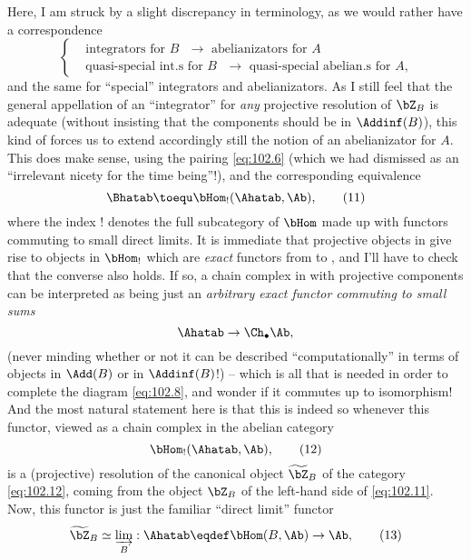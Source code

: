 Here, I am struck by a slight discrepancy in terminology, as we would
rather have a correspondence
\[
\begin{cases}
  &\text{integrators for $B$ $\to$ abelianizators for $A$} \\
  &\text{quasi-special int.s for $B$ $\to$ quasi-special abelian.s for $A$,}
\end{cases}\]
and the same for ``special'' integrators and abelianizators. As I
still feel that the general appellation of an ``integrator'' for
\emph{any} projective resolution of $\bZ_B$ is adequate (without
insisting that the components should be in $\Addinf(B)$), this kind of
forces us to extend accordingly still the notion of an abelianizator
for $A$. This does make sense, using the pairing \eqref{eq:102.6}
(which we had dismissed as an ``irrelevant nicety for the time
being''!), and the corresponding equivalence
\begin{equation}
  \label{eq:102.11}
  \Bhatab \toequ \bHom_!(\Ahatab, \Ab),\tag{11}
\end{equation}
where the index $!$ denotes the full subcategory of $\bHom$ made up
with functors commuting to small direct limits. It is immediate that
projective objects in \Bhatab{} give rise to objects in $\bHom_!$
which are \emph{exact} functors from \Ahatab{} to \Ab, and I'll have to
check that the converse also holds. If so, a chain complex in
\Bhatab{} with projective components can be interpreted as being just
an \emph{arbitrary exact functor commuting to small sums}
\[ \Ahatab \to \Ch_\bullet\Ab,\]
(never minding whether or not it can be described ``computationally''
in terms of objects in $\Add(B)$ or in $\Addinf(B)$!) -- which is all
that is needed in order to complete the diagram \eqref{eq:102.8}, and
wonder if it commutes up to isomorphism! And the most natural
statement here is that this is indeed so whenever this functor, viewed
as a chain complex in the abelian category
\begin{equation}
  \label{eq:102.12}
  \bHom_!(\Ahatab,\Ab),\tag{12}
\end{equation}
is a (projective) resolution of the canonical object $\widetilde\bZ_B$
of the category \eqref{eq:102.12}, coming from the object $\bZ_B$ of
the left-hand side of \eqref{eq:102.11}. Now, this functor is just the
familiar ``direct limit'' functor
\begin{equation}
  \label{eq:102.13}
  \widetilde\bZ_B \simeq \varinjlim_B : \Ahatab \eqdef \bHom(B,\Ab)
  \to \Ab,\tag{13}
\end{equation}
